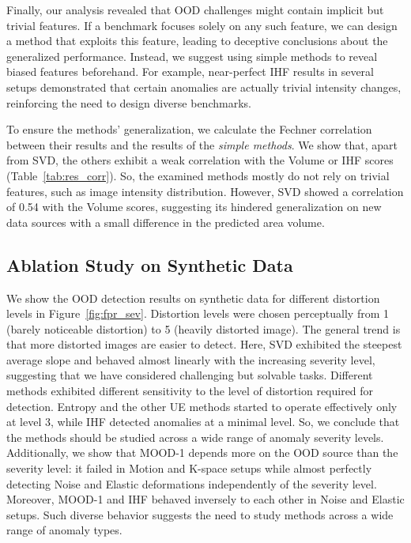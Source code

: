 Finally, our analysis revealed that OOD challenges might contain implicit but trivial features. If a benchmark focuses solely on any such feature, we can design a method that exploits this feature, leading to deceptive conclusions about the generalized performance. Instead, we suggest using simple methods to reveal biased features beforehand. For example, near-perfect IHF results in several setups demonstrated that certain anomalies are actually trivial intensity changes, reinforcing the need to design diverse benchmarks.

To ensure the methods' generalization, we calculate the Fechner correlation between their results and the results of the \textit{simple methods}. We show that, apart from SVD, the others exhibit a weak correlation with the Volume or IHF scores (Table~\ref{tab:res_corr}). So, the examined methods mostly do not rely on trivial features, such as image intensity distribution. However, SVD showed a correlation of 0.54 with the Volume scores, suggesting its hindered generalization on new data sources with a small difference in the predicted area volume.




\subsection{Ablation Study on Synthetic Data}

We show the OOD detection results on synthetic data for different distortion levels in Figure~\ref{fig:fpr_sev}. Distortion levels were chosen perceptually from 1 (barely noticeable distortion) to 5 (heavily distorted image). The general trend is that more distorted images are easier to detect. Here, SVD exhibited the steepest average slope and behaved almost linearly with the increasing severity level, suggesting that we have considered challenging but solvable tasks. Different methods exhibited different sensitivity to the level of distortion required for detection. Entropy and the other UE methods started to operate effectively only at level 3, while IHF detected anomalies at a minimal level. So, we conclude that the methods should be studied across a wide range of anomaly severity levels. Additionally, we show that MOOD-1 depends more on the OOD source than the severity level: it failed in Motion and K-space setups while almost perfectly detecting Noise and Elastic deformations independently of the severity level. Moreover, MOOD-1 and IHF behaved inversely to each other in Noise and Elastic setups. Such diverse behavior suggests the need to study methods across a wide range of anomaly types.

